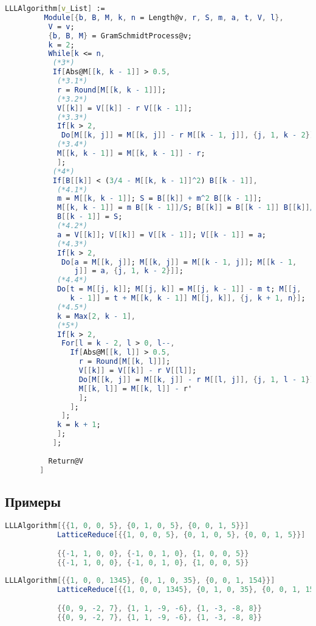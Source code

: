     	\begin{lstlisting}[language=Mathematica,caption={
      		LLL-алгоритм	
    	}]
		LLLAlgorithm[v_List] := 
		 Module[{b, B, M, k, n = Length@v, r, S, m, a, t, V, l},
		  V = v;
		  {b, B, M} = GramSchmidtProcess@v;
		  k = 2;
		  While[k <= n,
		   (*3*)
		   If[Abs@M[[k, k - 1]] > 0.5,
		    (*3.1*)
		    r = Round[M[[k, k - 1]]];
		    (*3.2*)
		    V[[k]] = V[[k]] - r V[[k - 1]];
		    (*3.3*)
		    If[k > 2, 
		     Do[M[[k, j]] = M[[k, j]] - r M[[k - 1, j]], {j, 1, k - 2}]];
		    (*3.4*)
		    M[[k, k - 1]] = M[[k, k - 1]] - r;
		    ];
		   (*4*)
		   If[B[[k]] < (3/4 - M[[k, k - 1]]^2) B[[k - 1]],
		    (*4.1*)
		    m = M[[k, k - 1]]; S = B[[k]] + m^2 B[[k - 1]];
		    M[[k, k - 1]] = m B[[k - 1]]/S; B[[k]] = B[[k - 1]] B[[k]]/S; 
		    B[[k - 1]] = S;
		    (*4.2*)
		    a = V[[k]]; V[[k]] = V[[k - 1]]; V[[k - 1]] = a;
		    (*4.3*)
		    If[k > 2, 
		     Do[a = M[[k, j]]; M[[k, j]] = M[[k - 1, j]]; M[[k - 1, 
		        j]] = a, {j, 1, k - 2}]];
		    (*4.4*)
		    Do[t = M[[j, k]]; M[[j, k]] = M[[j, k - 1]] - m t; M[[j, 
		       k - 1]] = t + M[[k, k - 1]] M[[j, k]], {j, k + 1, n}];
		    (*4.5*)
		    k = Max[2, k - 1],
		    (*5*)
		    If[k > 2,
		     For[l = k - 2, l > 0, l--,
		       If[Abs@M[[k, l]] > 0.5,
		         r = Round[M[[k, l]]];
		         V[[k]] = V[[k]] - r V[[l]];
		         Do[M[[k, j]] = M[[k, j]] - r M[[l, j]], {j, 1, l - 1}];
		         M[[k, l]] = M[[k, l]] - r'
		         ];
		       ];
		     ];
		    k = k + 1;
		    ];
		   ];
		  
	  	  Return@V
  		]
    	\end{lstlisting}

    	\subsection{Примеры}

	    	\begin{lstlisting}[language=Mathematica,caption={
	      		Пример	1
	    	}]
			LLLAlgorithm[{{1, 0, 0, 5}, {0, 1, 0, 5}, {0, 0, 1, 5}}]
			LatticeReduce[{{1, 0, 0, 5}, {0, 1, 0, 5}, {0, 0, 1, 5}}]

			{{-1, 1, 0, 0}, {-1, 0, 1, 0}, {1, 0, 0, 5}}
			{{-1, 1, 0, 0}, {-1, 0, 1, 0}, {1, 0, 0, 5}}
	    	\end{lstlisting}

	    	\begin{lstlisting}[language=Mathematica,caption={
	      		Пример	2
	    	}]
			LLLAlgorithm[{{1, 0, 0, 1345}, {0, 1, 0, 35}, {0, 0, 1, 154}}]
			LatticeReduce[{{1, 0, 0, 1345}, {0, 1, 0, 35}, {0, 0, 1, 154}}]

			{{0, 9, -2, 7}, {1, 1, -9, -6}, {1, -3, -8, 8}}
			{{0, 9, -2, 7}, {1, 1, -9, -6}, {1, -3, -8, 8}}
	    	\end{lstlisting}

